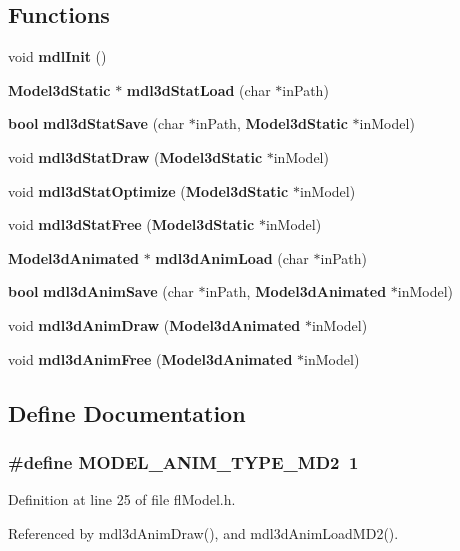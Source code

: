 \subsection*{Functions}
\begin{CompactItemize}
\item 
void {\bf mdl\-Init} ()
\item 
{\bf Model3d\-Static} $\ast$ {\bf mdl3d\-Stat\-Load} (char $\ast$in\-Path)
\item 
{\bf bool} {\bf mdl3d\-Stat\-Save} (char $\ast$in\-Path, {\bf Model3d\-Static} $\ast$in\-Model)
\item 
void {\bf mdl3d\-Stat\-Draw} ({\bf Model3d\-Static} $\ast$in\-Model)
\item 
void {\bf mdl3d\-Stat\-Optimize} ({\bf Model3d\-Static} $\ast$in\-Model)
\item 
void {\bf mdl3d\-Stat\-Free} ({\bf Model3d\-Static} $\ast$in\-Model)
\item 
{\bf Model3d\-Animated} $\ast$ {\bf mdl3d\-Anim\-Load} (char $\ast$in\-Path)
\item 
{\bf bool} {\bf mdl3d\-Anim\-Save} (char $\ast$in\-Path, {\bf Model3d\-Animated} $\ast$in\-Model)
\item 
void {\bf mdl3d\-Anim\-Draw} ({\bf Model3d\-Animated} $\ast$in\-Model)
\item 
void {\bf mdl3d\-Anim\-Free} ({\bf Model3d\-Animated} $\ast$in\-Model)
\end{CompactItemize}


\subsection{Define Documentation}
\subsubsection{\setlength{\rightskip}{0pt plus 5cm}\#define MODEL\_\-ANIM\_\-TYPE\_\-MD2~1}\label{flModel_8h_4ba59df590fcbf41f4d7961925c77c19}




Definition at line 25 of file fl\-Model.h.

Referenced by mdl3d\-Anim\-Draw(), and mdl3d\-Anim\-Load\-MD2().
